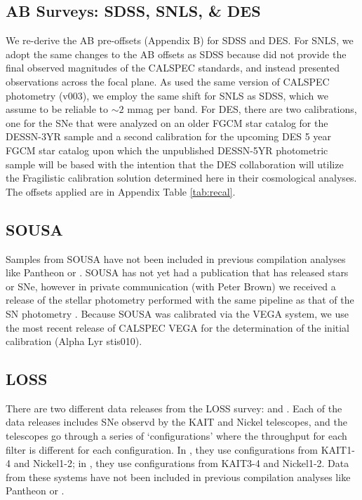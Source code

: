 \documentclass[twocolumn]{aastex63}
\newcommand{\blue}{\color{black}}
\begin{document}
\subsection{AB Surveys: SDSS, SNLS, \& DES}
We re-derive the AB pre-offsets (Appendix B) for SDSS and DES. For SNLS, we adopt the same changes to the AB offsets as SDSS because \cite{Betoule2014} did not provide the final observed magnitudes of the CALSPEC standards, and instead presented observations across the focal plane.  As \cite{Betoule2014} used the same version of CALSPEC photometry (v003), we employ the same shift for SNLS as SDSS, which we assume to be reliable to $\sim2$ mmag per band.  For DES, there are two calibrations, one for the SNe that were analyzed on an older FGCM star catalog for the DESSN-3YR sample and a second calibration for the upcoming DES 5 year FGCM star catalog upon which the unpublished DESSN-5YR photometric sample will be based with the intention that the DES collaboration will utilize the Fragilistic calibration solution determined here in their cosmological analyses. {\blue The offsets applied are in Appendix Table \ref{tab:recal}.}

\subsection{SOUSA}
Samples from SOUSA have not been included in previous compilation analyses like Pantheon or \cite{Betoule2014}. SOUSA has not yet had a publication that has released stars or SNe, however in private communication (with Peter Brown) we received a release of the stellar photometry performed with the same pipeline as that of the SN photometry \citep{brown14}. Because SOUSA was calibrated via the VEGA system, we use the most recent release of CALSPEC VEGA for the determination of the initial calibration (Alpha Lyr stis010). 

\subsection{LOSS}
\label{sec:loss}
There are two different data releases from the LOSS survey: \citep[LOSS1;][]{Ganeshalingam10} and \citep[LOSS2;][]{KAIT-LOSS}.  Each of the data releases includes SNe observd by the KAIT and Nickel telescopes, and the telescopes go through a series of `configurations' where the throughput for each filter is different for each configuration.  In \cite{Ganeshalingam10}, they use configurations from KAIT1-4 and Nickel1-2; in \cite{KAIT-LOSS}, they use configurations from KAIT3-4 and Nickel1-2.
Data from these systems have not been included in previous compilation analyses like Pantheon or \cite{Betoule2014}.  
 
\end{document}

